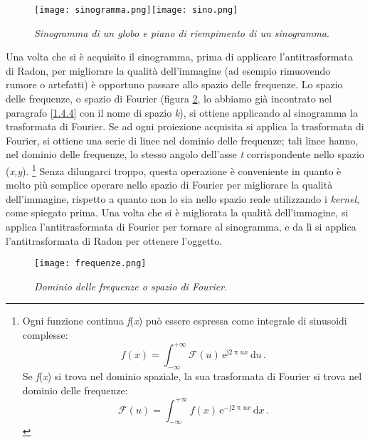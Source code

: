 \documentclass{report}
\newcommand{\figref}[1]{figura \ref{#1}}
\numberwithin{equation}{section}
\numberwithin{figure}{section}
\begin{document}
\begin{figure}[htp]
\centering
\texttt{[image: sinogramma.png]}\quad\texttt{[image: sino.png]}
\caption{\label{fig:sino} \textit{Sinogramma di un globo e piano di riempimento di un sinogramma}.}
\end{figure}

Una volta che si è acquisito il sinogramma, prima di applicare l'antitrasformata di Radon, per migliorare la qualità dell'immagine (ad esempio rimuovendo rumore o artefatti) è opportuno passare allo spazio delle frequenze. Lo spazio delle frequenze, o spazio di Fourier (\figref{fig:frequenze}, lo abbiamo già incontrato nel paragrafo \ref{1.4.4} con il nome di spazio \textit{k}), si ottiene applicando al sinogramma la trasformata di Fourier. Se ad ogni proiezione acquisita si applica la trasformata di Fourier, si ottiene una serie di linee nel dominio delle frequenze; tali linee hanno, nel dominio delle frequenze, lo stesso angolo dell'asse \textit{t} corrispondente nello spazio (\textit{x,y}).%
\footnote{Ogni funzione continua \textit{f}(\textit{x}) può essere espressa come integrale di sinusoidi complesse:
\begin{equation*}
    f(x) = \int_{-\infty}^{+\infty} \mathcal{F}(u)\,\mathrm{e}^{\mathrm{j} 2\uppi ux}\,\mathrm{d}u\,.
\end{equation*}
Se \textit{f}(\textit{x}) si trova nel dominio spaziale, la sua trasformata di Fourier si trova nel dominio delle frequenze:
\begin{equation*}
    \mathcal{F}(u) = \int_{-\infty}^{+\infty} f(x)\,\mathrm{e}^{-\mathrm{j} 2\uppi ux}\,\mathrm{d}x\,.
\end{equation*}}
Senza dilungarci troppo, questa operazione è conveniente in quanto è molto più semplice operare nello spazio di Fourier per migliorare la qualità dell'immagine, rispetto a quanto non lo sia nello spazio reale utilizzando i \textit{kernel}, come spiegato prima. Una volta che si è migliorata la qualità dell'immagine, si applica l'antitrasformata di Fourier per tornare al sinogramma, e da lì si applica l'antitrasformata di Radon per ottenere l'oggetto.

\begin{figure}[htp]
\centering
\texttt{[image: frequenze.png]}
\caption{\label{fig:frequenze} \textit{Dominio delle frequenze o spazio di Fourier}.}
\end{figure}
\end{document}
